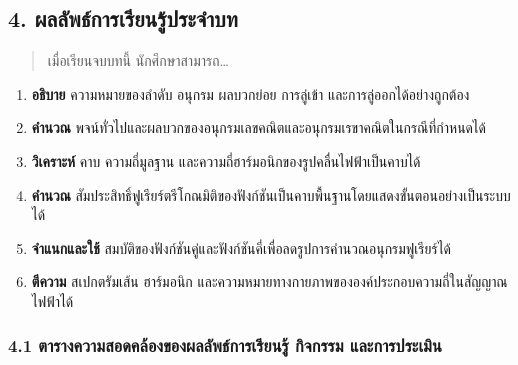 
\subsection{4. ผลลัพธ์การเรียนรู้ประจำบท}

\begin{quote}
เมื่อเรียนจบบทนี้ นักศึกษาสามารถ\ldots{}
\end{quote}

\begin{enumerate}
\def\labelenumi{\arabic{enumi}.}
\item
  \textbf{อธิบาย} ความหมายของลำดับ อนุกรม ผลบวกย่อย การลู่เข้า และการลู่ออกได้อย่างถูกต้อง
\item
  \textbf{คำนวณ} พจน์ทั่วไปและผลบวกของอนุกรมเลขคณิตและอนุกรมเรขาคณิตในกรณีที่กำหนดได้
\item
  \textbf{วิเคราะห์} คาบ ความถี่มูลฐาน และความถี่ฮาร์มอนิกของรูปคลื่นไฟฟ้าเป็นคาบได้
\item
  \textbf{คำนวณ} สัมประสิทธิ์ฟูเรียร์ตรีโกณมิติของฟังก์ชันเป็นคาบพื้นฐานโดยแสดงขั้นตอนอย่างเป็นระบบได้
\item
  \textbf{จำแนกและใช้} สมบัติของฟังก์ชันคู่และฟังก์ชันคี่เพื่อลดรูปการคำนวณอนุกรมฟูเรียร์ได้
\item
  \textbf{ตีความ} สเปกตรัมเส้น ฮาร์มอนิก และความหมายทางกายภาพขององค์ประกอบความถี่ในสัญญาณไฟฟ้าได้
\end{enumerate}

\subsubsection{4.1 ตารางความสอดคล้องของผลลัพธ์การเรียนรู้ กิจกรรม และการประเมิน}

